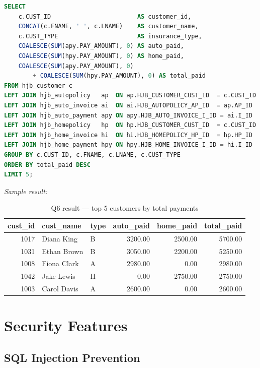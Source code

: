 \documentclass[12pt,letterpaper]{article}
\begin{document}
\begin{lstlisting}[language=SQL,caption={Q6: Top 5 customers by total payments}]
SELECT
    c.CUST_ID                        AS customer_id,
    CONCAT(c.FNAME, ' ', c.LNAME)    AS customer_name,
    c.CUST_TYPE                      AS insurance_type,
    COALESCE(SUM(apy.PAY_AMOUNT), 0) AS auto_paid,
    COALESCE(SUM(hpy.PAY_AMOUNT), 0) AS home_paid,
    COALESCE(SUM(apy.PAY_AMOUNT), 0)
        + COALESCE(SUM(hpy.PAY_AMOUNT), 0) AS total_paid
FROM hjb_customer c
LEFT JOIN hjb_autopolicy   ap  ON ap.HJB_CUSTOMER_CUST_ID  = c.CUST_ID
LEFT JOIN hjb_auto_invoice ai  ON ai.HJB_AUTOPOLICY_AP_ID  = ap.AP_ID
LEFT JOIN hjb_auto_payment apy ON apy.HJB_AUTO_INVOICE_I_ID = ai.I_ID
LEFT JOIN hjb_homepolicy   hp  ON hp.HJB_CUSTOMER_CUST_ID  = c.CUST_ID
LEFT JOIN hjb_home_invoice hi  ON hi.HJB_HOMEPOLICY_HP_ID  = hp.HP_ID
LEFT JOIN hjb_home_payment hpy ON hpy.HJB_HOME_INVOICE_I_ID = hi.I_ID
GROUP BY c.CUST_ID, c.FNAME, c.LNAME, c.CUST_TYPE
ORDER BY total_paid DESC
LIMIT 5;
\end{lstlisting}

\textit{Sample result:}
\begin{table}[H]
\centering\small
\begin{tabular}{rllrrr}
\toprule
\textbf{cust\_id} & \textbf{cust\_name} & \textbf{type} & \textbf{auto\_paid} & \textbf{home\_paid} & \textbf{total\_paid} \\
\midrule
1017 & Diana King    & B & 3200.00 & 2500.00 & 5700.00 \\
1031 & Ethan Brown   & B & 3050.00 & 2200.00 & 5250.00 \\
1008 & Fiona Clark   & A & 2980.00 & 0.00    & 2980.00 \\
1042 & Jake Lewis    & H & 0.00    & 2750.00 & 2750.00 \\
1003 & Carol Davis   & A & 2600.00 & 0.00    & 2600.00 \\
\bottomrule
\end{tabular}
\caption{Q6 result --- top 5 customers by total payments}
\end{table}

\section{Security Features}

\subsection{SQL Injection Prevention}
\end{document}
